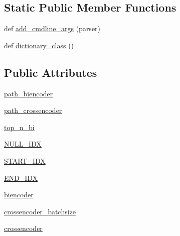 \subsection*{Static Public Member Functions}
\begin{DoxyCompactItemize}
\item 
def \hyperlink{classparlai_1_1agents_1_1bert__ranker_1_1both__encoder__ranker_1_1BothEncoderRankerAgent_a763f87c99544b29a0f8fae2c6019e2f8}{add\+\_\+cmdline\+\_\+args} (parser)
\item 
def \hyperlink{classparlai_1_1agents_1_1bert__ranker_1_1both__encoder__ranker_1_1BothEncoderRankerAgent_a4fd71b73fc926491aedc3da5921f62ca}{dictionary\+\_\+class} ()
\end{DoxyCompactItemize}
\subsection*{Public Attributes}
\begin{DoxyCompactItemize}
\item 
\hyperlink{classparlai_1_1agents_1_1bert__ranker_1_1both__encoder__ranker_1_1BothEncoderRankerAgent_a09440365a6c5a85c438f1a2bda393fff}{path\+\_\+biencoder}
\item 
\hyperlink{classparlai_1_1agents_1_1bert__ranker_1_1both__encoder__ranker_1_1BothEncoderRankerAgent_a5042e527dfb849630b553b3d06388764}{path\+\_\+crossencoder}
\item 
\hyperlink{classparlai_1_1agents_1_1bert__ranker_1_1both__encoder__ranker_1_1BothEncoderRankerAgent_ac4f692882d020eb3fced04859bd6f3ff}{top\+\_\+n\+\_\+bi}
\item 
\hyperlink{classparlai_1_1agents_1_1bert__ranker_1_1both__encoder__ranker_1_1BothEncoderRankerAgent_a3ab75f0b7e32e139b933b13b588917c4}{N\+U\+L\+L\+\_\+\+I\+DX}
\item 
\hyperlink{classparlai_1_1agents_1_1bert__ranker_1_1both__encoder__ranker_1_1BothEncoderRankerAgent_a4cde2fe30b33c41771c0747ceed6ad56}{S\+T\+A\+R\+T\+\_\+\+I\+DX}
\item 
\hyperlink{classparlai_1_1agents_1_1bert__ranker_1_1both__encoder__ranker_1_1BothEncoderRankerAgent_aa82e3a58e40ee874568e3ecd7bf1ec8f}{E\+N\+D\+\_\+\+I\+DX}
\item 
\hyperlink{classparlai_1_1agents_1_1bert__ranker_1_1both__encoder__ranker_1_1BothEncoderRankerAgent_a314d86777e26f7f1ab9a7b96bbaf1398}{biencoder}
\item 
\hyperlink{classparlai_1_1agents_1_1bert__ranker_1_1both__encoder__ranker_1_1BothEncoderRankerAgent_adcc57077c1fa3c461fecca24720f73bf}{crossencoder\+\_\+batchsize}
\item 
\hyperlink{classparlai_1_1agents_1_1bert__ranker_1_1both__encoder__ranker_1_1BothEncoderRankerAgent_a7ad0e098a0dd8278caa7ed77e147bfb1}{crossencoder}
\end{DoxyCompactItemize}
